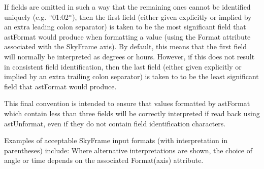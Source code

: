 \documentclass[twoside,11pt]{article}
\newcommand{\htmlref}[2]{#1}
\begin{document}
{{{         \sstitem
         If fields are omitted in such a way that the remaining ones
         cannot be identified uniquely (e.g. {\tt{"}}01:02{\tt{"}}), then the first
         field (either given explicitly or implied by an extra leading
         colon separator) is taken to be the most significant field that
         astFormat would produce when formatting a value (using the
         Format attribute associated with the SkyFrame axis).  By
         default, this means that the first field will normally be
         interpreted as degrees or hours. However, if this does not
         result in consistent field identification, then the last field
         (either given explicitly or implied by an extra trailing colon
         separator) is taken to to be the least significant field that
         astFormat would produce.

      }
      This final convention is intended to ensure that values formatted
      by astFormat which contain less than three fields will be
      correctly interpreted if read back using astUnformat, even if
      they do not contain field identification characters.

      Examples of acceptable SkyFrame input formats (with
      interpretation in parentheses) include:
      Where alternative interpretations are shown, the choice of angle or
      time depends on the associated \htmlref{Format(axis)}{Formataxis} attribute.
   }
}
\end{document}
